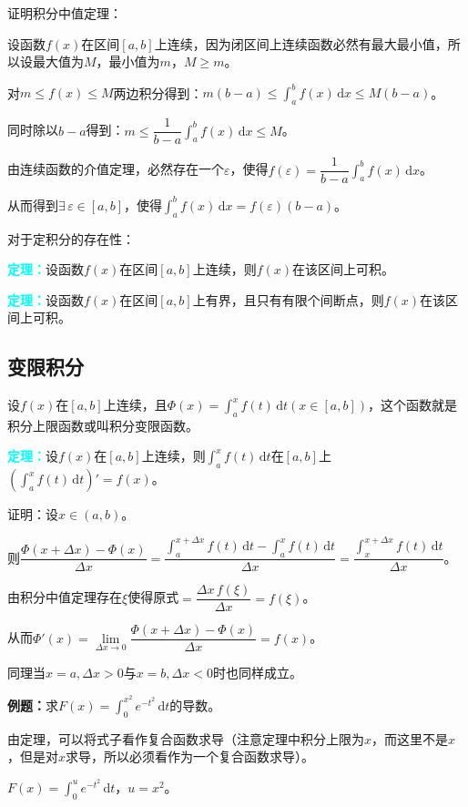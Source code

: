\documentclass[UTF8, 12pt]{ctexart}
\begin{document}
证明积分中值定理：

设函数$f(x)$在区间$[a,b]$上连续，因为闭区间上连续函数必然有最大最小值，所以设最大值为$M$，最小值为$m$，$M\geqslant m$。

对$m\leqslant f(x)\leqslant M$两边积分得到：$m(b-a)\leqslant\int_a^bf(x)\,\textrm{d}x\leqslant M(b-a)$。

同时除以$b-a$得到：$m\leqslant\dfrac{1}{b-a}\int_a^bf(x)\,\textrm{d}x\leqslant M$。

由连续函数的介值定理，必然存在一个$\varepsilon$，使得$f(\varepsilon)=\dfrac{1}{b-a}\int_a^bf(x)\,\textrm{d}x$。

从而得到$\exists\,\varepsilon\in[a,b]$，使得$\int_a^bf(x)\,\textrm{d}x=f(\varepsilon)(b-a)$。

对于定积分的存在性：

\textcolor{aqua}{\textbf{定理：}}设函数$f(x)$在区间$[a,b]$上连续，则$f(x)$在该区间上可积。

\textcolor{aqua}{\textbf{定理：}}设函数$f(x)$在区间$[a,b]$上有界，且只有有限个间断点，则$f(x)$在该区间上可积。

\subsection{变限积分}

设$f(x)$在$[a,b]$上连续，且$\Phi(x)=\int_a^xf(t)\,\textrm{d}t(x\in[a,b])$，这个函数就是积分上限函数或叫积分变限函数。

\textcolor{aqua}{\textbf{定理：}}设$f(x)$在$[a,b]$上连续，则$\int_a^xf(t)\,\textrm{d}t$在$[a,b]$上$(\int_a^xf(t)\,\textrm{d}t)'=f(x)$。

证明：设$x\in(a,b)$。

则$\dfrac{\Phi(x+\Delta x)-\Phi(x)}{\Delta x}=\dfrac{\int_a^{x+\Delta x}f(t)\,\textrm{d}t-\int_a^xf(t)\,\textrm{d}t}{\Delta x}=\dfrac{\int_x^{x+\Delta x}f(t)\,\textrm{d}t}{\Delta x}$。

由积分中值定理存在$\xi$使得原式$=\dfrac{\Delta x\,f(\xi)}{\Delta x}=f(\xi)$。

从而$\Phi'(x)=\lim\limits_{\Delta x\to 0}\dfrac{\Phi(x+\Delta x)-\Phi(x)}{\Delta x}=f(x)$。

同理当$x=a,\Delta x>0$与$x=b,\Delta x<0$时也同样成立。

\textbf{例题：}求$F(x)=\int_0^{x^2}e^{-t^2}\,\textrm{d}t$的导数。

由定理，可以将式子看作复合函数求导（注意定理中积分上限为$x$，而这里不是$x$，但是对$x$求导，所以必须看作为一个复合函数求导）。

$F(x)=\int_0^ue^{-t^2}\,\textrm{d}t$，$u=x^2$。
\end{document}
